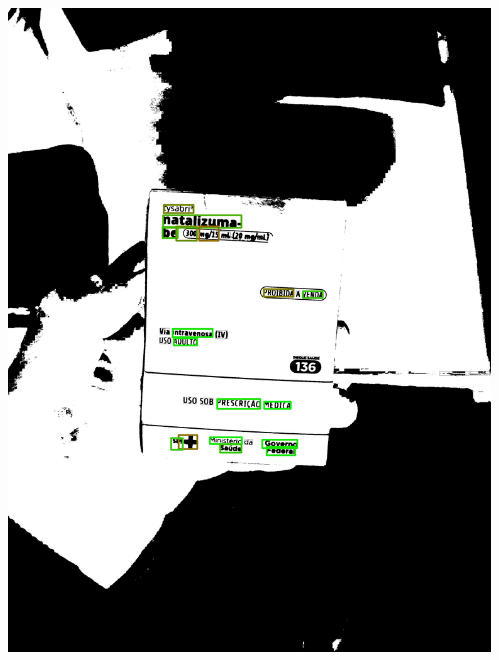 \begin{frame}
\begin{columns}
\begin{column}{0.24\textwidth}
			\includegraphics[height=0.35\textheight]{../pictures/tysabri_cmyk_y_only_thresh_boxes.jpg}
		\end{column}
		\begin{column}{0.24\textwidth}\centering

\end{column}
\end{columns}
\end{frame}

